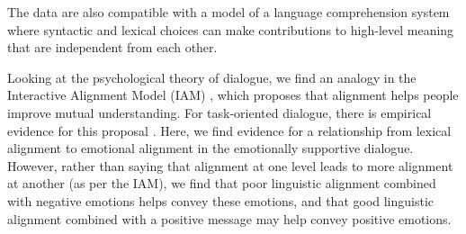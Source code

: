 \documentclass[man,biblatex,floatsintext]{apa6}
\begin{document}
The data are also
compatible with a model of a language comprehension system where syntactic and lexical choices can make contributions to high-level meaning that are independent from each other.


Looking at the psychological theory of dialogue, we find an analogy in the Interactive Alignment Model (IAM) \parencite{pickering2004toward}, which proposes that alignment helps people improve mutual understanding.  For task-oriented dialogue, there is empirical evidence for this proposal \parencite{reitter2014,xu2017acl}.  Here, we find evidence for a relationship from lexical alignment to emotional alignment in the emotionally supportive dialogue.  However, rather than saying that alignment at one level leads to more alignment at another (as per the IAM), we find that poor linguistic alignment combined with negative emotions helps convey these emotions, and that good linguistic alignment combined with a positive message may help convey positive emotions.




\end{document}
